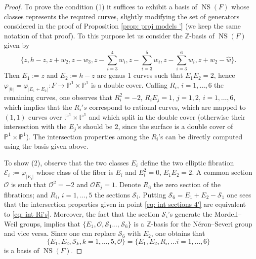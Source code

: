\documentclass{amsart}
\theoremstyle{definition}
\numberwithin{equation}{section}
\numberwithin{equation}{section} \theoremstyle{definition}
\DeclareMathOperator{\NS}{NS}
\newcommand{\ra}{\rightarrow}
\newcommand\Z{\mathbb{Z}}
\begin{document}
\begin{proof}
To prove the condition (1) it suffices to exhibit a basis of $\NS(F)$ whose classes represents the required curves, slightly modifying the set of generators considered in the proof of Proposition \ref{prop: proj models '} (we keep the same notation of that proof). To this purpose let us consider the $\Z$-basis of $\NS(F)$ given by $$\{z,h-z,z+w_2, z-w_3, z-\sum_{i=3}^4w_i, z-\sum_{i=3}^5w_i,  z-\sum_{i=3}^6w_i, z+w_2-\hat{w}\}.$$ Then $E_1:=z$ and $E_2:=h-z$ are genus 1 curves such that $E_1E_2=2$, hence $\varphi_{|h|}=\varphi_{|E_1+E_2|}:F\ra\mathbb{P}^1\times \mathbb{P}^1$ is a double cover. Calling $R_i$, $i=1,\ldots, 6$ the remaining curves, one observes that $R_i^2=-2$, $R_iE_j=1$, $j=1,2$, $i=1,\ldots, 6$, which implies that the $R_i's$ correspond to rational curves, which are mapped to $(1,1)$ curves over $\mathbb{P}^1\times \mathbb{P}^1$ and which split in the double cover (otherwise their intersection with the $E_j$'s should be 2, since the surface is a double cover of $\mathbb{P}^1\times\mathbb{P}^1$). The intersection properties among the $R_i$'s can be directly computed using the basis given above.

To show (2), observe that the two classes $E_i$ define the two elliptic fibration $\mathcal{E}_i:=\varphi_{|E_i|}$ whose class of the fiber is $E_i$ and $E_i^2=0$, $E_1E_2=2$. A common section $\mathcal{O}$ 
is such that $\mathcal{O}^2=-2$ and $\mathcal{O}E_j=1$. Denote $R_6$ the zero section of the fibrations; and $R_i$, $i=1,\ldots, 5$ the sections $\mathcal{S}_i$. Putting $\mathcal{S}_6=E_1+E_2-\mathcal{S}_1$ one sees that the intersection properties given in point \eqref{eq: int sections 4'} are equivalent to \eqref{eq: int Ri's}. Moreover, the fact that the section $\mathcal{S}_i$'s generate the Mordell--Weil groups, implies that $\{E_1,\mathcal{O},\mathcal{S}_1\ldots, \mathcal{S}_6\}$ is a $\Z$-basis for the N\'eron--Severi group and vice versa. Since one can replace $\mathcal{S}_6$ with $E_2$, one obtains that $$\{E_1,E_2,\mathcal{S}_k, k=1,\ldots, 5,\mathcal{O}\}=\{E_1,E_2,R_i,\ldots i=1,\ldots, 6\}$$ is a basis of $\NS(F).$\end{proof}
\end{document}
